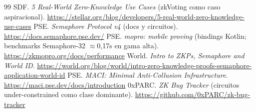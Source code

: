 \documentclass[twocolumn,10pt]{article}
\begin{document}
\begin{thebibliography}{99}
 SDF. \emph{5 Real-World Zero-Knowledge Use Cases} (zkVoting como caso aspiracional). \url{https://stellar.org/blog/developers/5-real-world-zero-knowledge-use-cases}
 PSE. \emph{Semaphore Protocol v4} (docs y circuitos). \url{https://docs.semaphore.pse.dev/}
 PSE. \emph{mopro: mobile proving} (bindings Kotlin; benchmarks Semaphore-32 $\approx$0{,}17s en gama alta). \url{https://zkmopro.org/docs/performance}
 World. \emph{Intro to ZKPs, Semaphore and World ID}. \url{https://world.org/blog/world/intro-zero-knowledge-proofs-semaphore-application-world-id}
 PSE. \emph{MACI: Minimal Anti-Collusion Infrastructure}. \url{https://maci.pse.dev/docs/introduction}
 0xPARC. \emph{ZK Bug Tracker} (circuitos under-constrained como clase dominante). \url{https://github.com/0xPARC/zk-bug-tracker}
\end{thebibliography}
\end{document}
